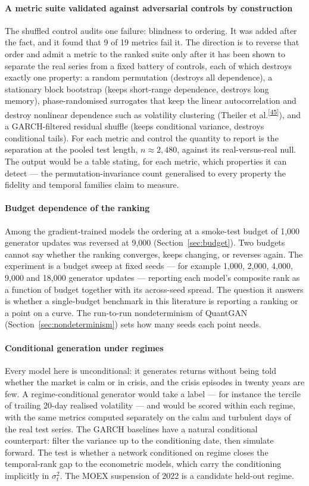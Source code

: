 \documentclass[11pt,a4paper]{article}
\makeatletter
\newcommand{\tcite}[1]{\textsuperscript{[\hyperlink{R:#1}{#1}]}}
\DeclareRobustCommand{\_}{\ifmmode\nfss@text{\textunderscore}\else\textunderscore\allowbreak\fi}
\makeatother
\begin{document}
\paragraph{A metric suite validated against adversarial controls by construction} The shuffled control audits one failure: blindness to ordering. It was added after the fact, and it found that 9 of 19 metrics fail it. The direction is to reverse that order and admit a metric to the ranked suite only after it has been shown to separate the real series from a fixed battery of controls, each of which destroys exactly one property: a random permutation (destroys all dependence), a stationary block bootstrap (keeps short-range dependence, destroys long memory), phase-randomised surrogates that keep the linear autocorrelation and destroy nonlinear dependence such as volatility clustering (Theiler et al.\tcite{45}), and a GARCH-filtered residual shuffle (keeps conditional variance, destroys conditional tails). For each metric and control the quantity to report is the separation at the pooled test length, $n\approx2{,}480$, against its real-versus-real null. The output would be a table stating, for each metric, which properties it can detect --- the permutation-invariance count generalised to every property the fidelity and temporal families claim to measure.

\paragraph{Budget dependence of the ranking} Among the gradient-trained models the ordering at a smoke-test budget of 1{,}000 generator updates was reversed at 9,000 (Section~\ref{sec:budget}). Two budgets cannot say whether the ranking converges, keeps changing, or reverses again. The experiment is a budget sweep at fixed seeds --- for example 1{,}000, 2{,}000, 4{,}000, 9{,}000 and 18{,}000 generator updates --- reporting each model's composite rank as a function of budget together with its across-seed spread. The question it answers is whether a single-budget benchmark in this literature is reporting a ranking or a point on a curve. The run-to-run nondeterminism of QuantGAN (Section~\ref{sec:nondeterminism}) sets how many seeds each point needs.

\paragraph{Conditional generation under regimes} Every model here is unconditional: it generates returns without being told whether the market is calm or in crisis, and the crisis episodes in twenty years are few. A regime-conditional generator would take a label --- for instance the tercile of trailing 20-day realised volatility --- and would be scored within each regime, with the same metrics computed separately on the calm and turbulent days of the real test series. The GARCH baselines have a natural conditional counterpart: filter the variance up to the conditioning date, then simulate forward. The test is whether a network conditioned on regime closes the temporal-rank gap to the econometric models, which carry the conditioning implicitly in $\sigma_t^2$. The MOEX suspension of 2022 is a candidate held-out regime.
\end{document}
